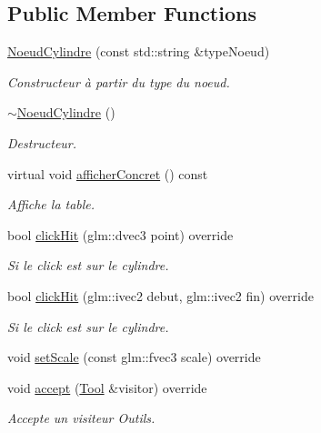\subsection*{Public Member Functions}
{\bf }\par
\begin{DoxyCompactItemize}
\item 
\hyperlink{class_noeud_cylindre_aee7f35b6d758ac40b96daadf526f4504}{Noeud\+Cylindre} (const std\+::string \&type\+Noeud)
\begin{DoxyCompactList}\small\item\em Constructeur à partir du type du noeud. \end{DoxyCompactList}\item 
\hyperlink{class_noeud_cylindre_aa08fe15b1f926c8d651fcd467d3cb36a}{$\sim$\+Noeud\+Cylindre} ()
\begin{DoxyCompactList}\small\item\em Destructeur. \end{DoxyCompactList}\item 
virtual void \hyperlink{class_noeud_cylindre_a24bd5b287091cdecdd250ebb83594551}{afficher\+Concret} () const 
\begin{DoxyCompactList}\small\item\em Affiche la table. \end{DoxyCompactList}\item 
bool \hyperlink{class_noeud_cylindre_a524d454765b791a68d42e10254e58885}{click\+Hit} (glm\+::dvec3 point) override
\begin{DoxyCompactList}\small\item\em Si le click est sur le cylindre. \end{DoxyCompactList}\item 
bool \hyperlink{class_noeud_cylindre_a461dfbf53728711e290d14db7464f5f9}{click\+Hit} (glm\+::ivec2 debut, glm\+::ivec2 fin) override
\begin{DoxyCompactList}\small\item\em Si le click est sur le cylindre. \end{DoxyCompactList}\item 
void \hyperlink{class_noeud_cylindre_a37f3266147e98c0dd312ac674d88e9b4}{set\+Scale} (const glm\+::fvec3 scale) override
\item 
void \hyperlink{class_noeud_cylindre_a108b067e7817f5c83ca66643bb67769b}{accept} (\hyperlink{class_tool}{Tool} \&visitor) override
\begin{DoxyCompactList}\small\item\em Accepte un visiteur Outils. \end{DoxyCompactList}\end{DoxyCompactItemize}

